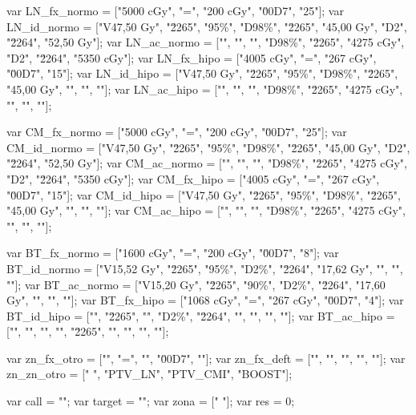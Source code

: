 		var LN_fx_normo = ["5000 cGy", "=", "200 cGy", "\u00D7", "25"];
		var LN_id_normo = ["V47,50 Gy", "\u2265", "95\%", "D98\%", "\u2265", "45,00 Gy", "D2", "\u2264", "52,50 Gy"];
		var LN_ac_normo = ["", "", "", "D98\%", "\u2265", "4275 cGy", "D2", "\u2264", "5350 cGy"]; 
		var LN_fx_hipo  = ["4005 cGy", "=", "267 cGy", "\u00D7", "15"];
		var LN_id_hipo  = ["V47,50 Gy", "\u2265", "95\%", "D98\%", "\u2265", "45,00 Gy", "", "", ""];
		var LN_ac_hipo  = ["", "", "", "D98\%", "\u2265", "4275 cGy", "", "", ""]; 

		var CM_fx_normo = ["5000 cGy", "=", "200 cGy", "\u00D7", "25"];
		var CM_id_normo = ["V47,50 Gy", "\u2265", "95\%", "D98\%", "\u2265", "45,00 Gy", "D2", "\u2264", "52,50 Gy"];
		var CM_ac_normo = ["",      "",       "",     "D98\%", "\u2265", "4275 cGy", "D2", "\u2264", "5350 cGy"]; 
		var CM_fx_hipo  = ["4005 cGy", "=", "267 cGy", "\u00D7", "15"];
		var CM_id_hipo  = ["V47,50 Gy", "\u2265", "95\%", "D98\%", "\u2265", "45,00 Gy", "", "", ""];
		var CM_ac_hipo  = ["", "", "", "D98\%", "\u2265", "4275 cGy", "", "", ""]; 

		var BT_fx_normo = ["1600 cGy", "=", "200 cGy", "\u00D7", "8"];
		var BT_id_normo = ["V15,52 Gy", "\u2265", "95\%", "D2\%", "\u2264", "17,62 Gy", "", "", ""];
		var BT_ac_normo = ["V15,20 Gy", "\u2265", "90\%", "D2\%", "\u2264", "17,60 Gy", "", "", ""]; 	
		var BT_fx_hipo  = ["1068 cGy", "=", "267 cGy", "\u00D7", "4"];
		var BT_id_hipo  = ["", "\u2265", "", "D2\%", "\u2264", "", "", "", ""];
		var BT_ac_hipo  = ["", "", "", "", "\u2265", "", "", "", ""]; 

		var zn_fx_otro  = ["", "=", "", "\u00D7", ""];
		var zn_fx_deft  = ["", "", "", "", ""];
		var zn_zn_otro  = [" ", "PTV_LN", "PTV_CMI", "BOOST"];

		var call = "";
		var target = "";
		var zona = [" "];
		var res = 0;

